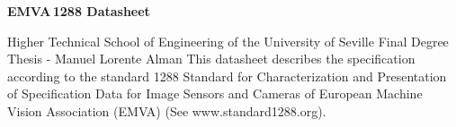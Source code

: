 \documentclass[a4paper,twoside,12pt,american,hidelinks]{article}
\title{}
\author{}
\date{}
\begin{document}
\newcommand{\TheReportSection}{}
\newcommand{\ReportSection}[1]{\renewcommand{\TheReportSection}{#1}}

\newsavebox\wtmkbox
\savebox\wtmkbox{\tikz[color=red,opacity=0.3]\node{%
\newwatermark*[
allpages, angle=45.0, scale=8.0, xpos=-20, ypos=15
]{\usebox\wtmkbox}

}}

\ReportSection{EMVA\,1288 Datasheet}
\pagestyle{fancy}
\scriptsize
\textbf{EMVA\,1288 Datasheet}
\vspace*{5mm}

\begin{minipage}[t]{0.975\linewidth}
Higher Technical School of Engineering of the University of Seville
			Final Degree Thesis - Manuel Lorente Alman
This datasheet describes the specification according to the standard 1288
Standard for Characterization and Presentation of Specification Data for
Image Sensors and Cameras of European Machine Vision Association (EMVA)
(See www.standard1288.org).
\end{minipage}
\vspace*{5mm}

\end{document}
